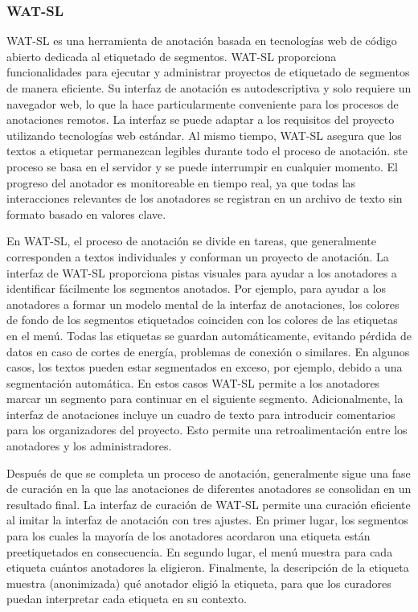 \subsubsection*{WAT-SL}

WAT-SL es una herramienta de anotación basada en tecnologías web de código abierto dedicada al etiquetado de segmentos.
WAT-SL proporciona funcionalidades para ejecutar y administrar proyectos de etiquetado de segmentos de manera eficiente. Su interfaz de anotación es autodescriptiva y solo requiere un navegador web, lo que la hace particularmente conveniente para los procesos de anotaciones remotos.
La interfaz se puede adaptar a los requisitos del proyecto utilizando tecnologías web estándar.
Al mismo tiempo, WAT-SL asegura que los textos a etiquetar permanezcan legibles durante todo el proceso de anotación.
ste proceso se basa en el servidor y se puede interrumpir en cualquier momento.
El progreso del anotador es monitoreable en tiempo real, ya que todas las interacciones relevantes de los anotadores se registran en un archivo de texto sin formato basado en valores clave.

En WAT-SL, el proceso de anotación se divide en tareas, que generalmente corresponden a textos individuales y conforman un proyecto de anotación.
La interfaz de WAT-SL proporciona pistas visuales para ayudar a los anotadores a identificar fácilmente los segmentos anotados.
Por ejemplo, para ayudar a los anotadores a formar un modelo mental de la interfaz de anotaciones, los colores de fondo de los segmentos etiquetados coinciden con los colores de las etiquetas en el menú.
Todas las etiquetas se guardan automáticamente, evitando pérdida de datos en caso de cortes de energía, problemas de conexión o similares.
En algunos casos, los textos pueden estar segmentados en exceso, por ejemplo, debido a una segmentación automática.
En estos casos WAT-SL permite a los anotadores marcar un segmento para continuar en el siguiente segmento.
Adicionalmente, la interfaz de anotaciones incluye un cuadro de texto para introducir comentarios para los organizadores del proyecto.
Esto permite una retroalimentación entre los anotadores y los administradores.

Después de que se completa un proceso de anotación, generalmente sigue una fase de curación en la que las anotaciones de diferentes anotadores se consolidan en un resultado final.
La interfaz de curación de WAT-SL permite una curación eficiente al imitar la interfaz de anotación con tres ajustes.
En primer lugar, los segmentos para los cuales la mayoría de los anotadores acordaron una etiqueta están preetiquetados en consecuencia.
En segundo lugar, el menú muestra para cada etiqueta cuántos anotadores la eligieron.
Finalmente, la descripción de la etiqueta muestra (anonimizada) qué anotador eligió la etiqueta, para que los curadores puedan interpretar cada etiqueta en su contexto.

